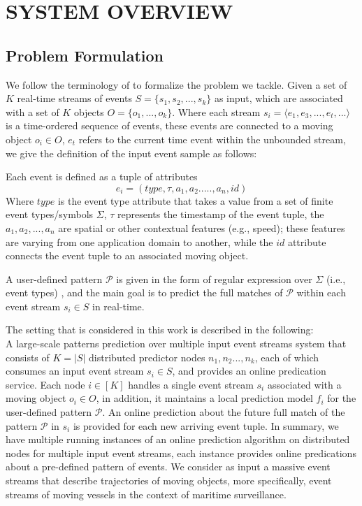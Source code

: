 \section{SYSTEM OVERVIEW}
\subsection{Problem Formulation}

We follow the terminology of \cite{luckham2008power,alevizos2015complex,zhou2015pattern} to formalize the problem we tackle. Given a set of \emph{$K$} real-time streams of events $S = \{ s_1,s_2, ..., s_k\}$ as input, which are associated with a set of $K$  objects $O = \{ o_1, ..., o_k\}$. Where each stream $s_i=\langle e_1,e_3,...,e_t,...\rangle$  is a time-ordered sequence of events, these events are connected to a moving object  $o_i \in O$,  $e_t$  refers to the current time event within the unbounded stream, we give the definition of the input event sample as follows:  
\begin{definition}
	Each event is defined as a tuple of attributes $$e_i = (type,\tau,a_1,a_2.....,a_n,id)$$ Where $type$ is the event type attribute that takes a value from a set of finite event types/symbols $\Sigma$, $\tau$ represents the timestamp of the event tuple,  the  $a_1,a_2,...,a_n$ are spatial or other contextual features (e.g., speed); these features are varying from one application domain to another, while the $id$ attribute connects the event tuple to an associated moving object.
\end{definition}

A user-defined pattern $\mathcal{P}$ is given in the form of regular expression over $\Sigma$ (i.e., event types) \cite{alevizos2017event}, and the main goal is to predict the full matches of $\mathcal{P}$ within each event stream $s_i\in S$ in real-time.

\par The setting that is considered in this work is described in the following:\\
A large-scale patterns prediction over multiple input event streams system that  consists of $K=\left\vert{S}\right\vert$ distributed predictor nodes $n_1,n_2...,n_k$, each of which consumes an input event stream $s_i\in S$, and provides an online predication service. Each node $i \in [K]$ handles a single event stream $s_i$ associated with a moving object $o_i \in O$, in addition,  it  maintains a local prediction model $f_i$ for the user-defined pattern $\mathcal{P}$. An online prediction about the future full match of the pattern $\mathcal{P}$ in $s_i$ is provided for each new arriving event tuple. In summary, we have multiple running instances of an online prediction algorithm on distributed nodes for multiple input event streams, each instance provides online predications about a pre-defined pattern of events.  We consider as input a massive event streams that describe trajectories of  moving objects, more specifically, event streams of moving vessels in the context of maritime surveillance.  

